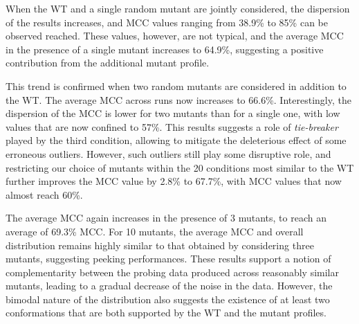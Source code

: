 \documentclass[a4,center,fleqn]{NAR}
\begin{document}
When the WT and a single random mutant are jointly considered, the dispersion of the results increases, and MCC values ranging from 38.9\% to 85\% can be observed reached.%
These values, however, are not typical, and the average MCC in the presence of a single mutant increases to 64.9\%,%
suggesting a positive contribution from the additional mutant profile. 

This trend is confirmed when two random mutants are considered in addition to the WT. The average MCC across runs now increases to 66.6\%. %
Interestingly, the dispersion of the MCC is lower for two mutants than for a single one, with low values that are now confined to 57\%.  This results suggests  a role of \emph{tie-breaker} played by the third condition, allowing to mitigate the deleterious effect of some erroneous outliers.
However, such outliers still play some disruptive role, and restricting our choice of mutants within the 20 conditions most similar to the WT further improves the MCC value by 2.8\% to 67.7\%, with MCC values that now almost reach 60\%.  

The average MCC again increases in the presence of 3 mutants, to reach an average of 69.3\% MCC. For 10 mutants, the average MCC and overall distribution remains highly similar to that obtained by considering three mutants, suggesting peeking performances. These results support a notion of complementarity between the probing data produced across reasonably similar mutants, leading to a gradual decrease of the noise in the data. However, the bimodal nature of the distribution also suggests the existence of at least two conformations that are both supported by the WT and the mutant profiles.
\end{document}
